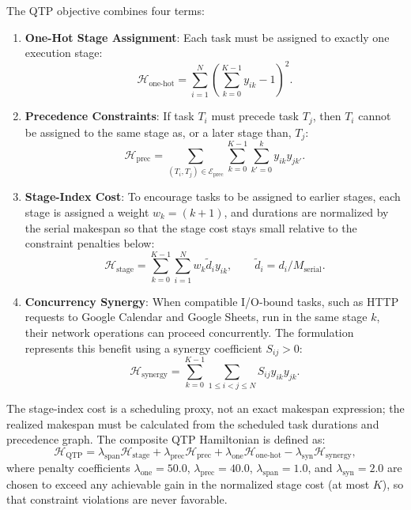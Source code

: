 \documentclass[review,12pt,times,authoryear]{elsarticle}
\theoremstyle{definition}
\begin{document}
The QTP objective combines four terms:
\begin{enumerate}[leftmargin=*]
  \item \textbf{One-Hot Stage Assignment}: Each task must be assigned to exactly one execution stage:
  \begin{equation}
  \mathcal{H}_{\text{one-hot}} = \sum_{i=1}^N \left( \sum_{k=0}^{K-1} y_{ik} - 1 \right)^2.
  \end{equation}
  \item \textbf{Precedence Constraints}: If task $T_i$ must precede task $T_j$, then $T_i$ cannot be assigned to the same stage as, or a later stage than, $T_j$:
  \begin{equation}
  \mathcal{H}_{\text{prec}} = \sum_{(T_i, T_j) \in \mathcal{E}_{\text{prec}}} \sum_{k=0}^{K-1} \sum_{k'=0}^k y_{ik} y_{jk'}.
  \end{equation}
  \item \textbf{Stage-Index Cost}: To encourage tasks to be assigned to earlier stages, each stage is assigned a weight $w_k = (k+1)$, and durations are normalized by the serial makespan so that the stage cost stays small relative to the constraint penalties below:
  \begin{equation}
  \mathcal{H}_{\text{stage}} = \sum_{k=0}^{K-1} \sum_{i=1}^N w_k \tilde{d}_i y_{ik}, \qquad \tilde{d}_i = d_i / M_{\text{serial}}.
  \end{equation}
  \item \textbf{Concurrency Synergy}: When compatible I/O-bound tasks, such as HTTP requests to Google Calendar and Google Sheets, run in the same stage $k$, their network operations can proceed concurrently. The formulation represents this benefit using a synergy coefficient $S_{ij} > 0$:
  \begin{equation}
  \mathcal{H}_{\text{synergy}} = \sum_{k=0}^{K-1} \sum_{1 \le i < j \le N} S_{ij} y_{ik} y_{jk}.
  \end{equation}
\end{enumerate}

The stage-index cost is a scheduling proxy, not an exact makespan expression; the realized makespan must be calculated from the scheduled task durations and precedence graph. The composite QTP Hamiltonian is defined as:
\begin{equation}
\label{eq:qtp_hamiltonian}
\mathcal{H}_{\text{QTP}} = \lambda_{\text{span}} \mathcal{H}_{\text{stage}} + \lambda_{\text{prec}} \mathcal{H}_{\text{prec}} + \lambda_{\text{one}} \mathcal{H}_{\text{one-hot}} - \lambda_{\text{syn}} \mathcal{H}_{\text{synergy}},
\end{equation}
where penalty coefficients $\lambda_{\text{one}} = 50.0$, $\lambda_{\text{prec}} = 40.0$, $\lambda_{\text{span}} = 1.0$, and $\lambda_{\text{syn}} = 2.0$ are chosen to exceed any achievable gain in the normalized stage cost (at most $K$), so that constraint violations are never favorable.
\end{document}

